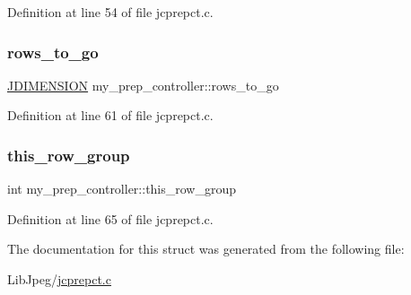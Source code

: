 Definition at line 54 of file jcprepct.\+c.

\mbox{\label{structmy__prep__controller_a824b65d503dae6698d6a482d49a8043c}} 
\subsubsection{\texorpdfstring{rows\_to\_go}{rows\_to\_go}}
{\footnotesize\ttfamily \mbox{\hyperlink{jmorecfg_8h_a04ed4674f6f1d0d50ec241531e38274f}{J\+D\+I\+M\+E\+N\+S\+I\+ON}} my\+\_\+prep\+\_\+controller\+::rows\+\_\+to\+\_\+go}



Definition at line 61 of file jcprepct.\+c.

\mbox{\label{structmy__prep__controller_a2fd911bc5ad6043822b493554513b8bb}} 
\subsubsection{\texorpdfstring{this\_row\_group}{this\_row\_group}}
{\footnotesize\ttfamily int my\+\_\+prep\+\_\+controller\+::this\+\_\+row\+\_\+group}



Definition at line 65 of file jcprepct.\+c.



The documentation for this struct was generated from the following file\+:\begin{DoxyCompactItemize}
\item 
Lib\+Jpeg/\mbox{\hyperlink{jcprepct_8c}{jcprepct.\+c}}\end{DoxyCompactItemize}
